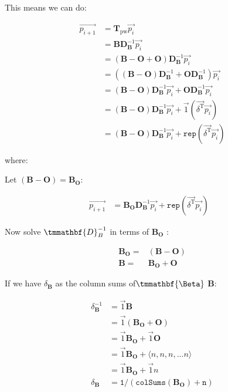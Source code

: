 \documentclass[11pt]{article}
\begin{document}
This means we can do:

\begin{align}
  \overrightarrow{p_{i + 1}} & = \mathbf{T}_{\mathrm{pw}}
  \overrightarrow{p_i}\\
& = \mathbf{BD}_{\mathbf{B}}^{- 1}
  \overrightarrow{p_i}\\
  & = \left( \mathbf{B} - \mathbf{O} + \mathbf{O} \right)
  \mathbf{D}_{\mathbf{B}}^{- 1} \overrightarrow{p_i}\\
  & = \left( \left( \mathbf{B} - \mathbf{O} \right)
  \mathbf{D}_{\mathbf{B}}^{- 1} + \mathbf{OD}_{\mathbf{B}}^{- 1} \right)
  \overrightarrow{p_i}\\
  & = \left( \mathbf{B} - \mathbf{O} \right) \mathbf{D}_{\mathbf{B}}^{- 1}
  \overrightarrow{p_i} + \mathbf{OD}_{\mathbf{B}}^{- 1} \overrightarrow{p_i}\\
  & = \left( \mathbf{B} - \mathbf{O} \right) \mathbf{D}_{\mathbf{B}}^{- 1}
  \overrightarrow{p_i} + \vec{1} (\overrightarrow{\delta^{\mathrm{T}}}
  \overrightarrow{p_i}) \\
  & = \left( \mathbf{B} - \mathbf{O} \right) \mathbf{D}_{\mathbf{B}}^{- 1}
  \overrightarrow{p_i} + \mathtt{rep} (\overrightarrow{\delta^{\mathrm{T}}}
  \overrightarrow{p_i})
\end{align}

where:


Let \((\mathbf{B}-\mathbf{O}) = \mathbf{B_{\mathbf{O}}}\):

\begin{eqnarray*}
  \overrightarrow{p_{i + 1}} & = \mathbf{B_{\mathbf{O}}} \mathbf{D}_{\mathbf{B}}^{- 1}
  \overrightarrow{p_i} + \mathtt{rep} (\overrightarrow{\delta^{\mathrm{T}}}
  \overrightarrow{p_i}) &
\end{eqnarray*}

Now solve \(\tmmathbf{D}_B^{- 1}\) in terms of \(\mathbf{B_{O}}\) :

\begin{align}
  \mathbf{B}_{\mathbf{\mathbf{O}}} = & (\mathbf{B}-\mathbf{O})\\
  \mathbf{B} = & \mathbf{B}_{\mathbf{\mathbf{O}}}
  +\mathbf{O}
\end{align}

If we have \(\delta_{\mathbf{B}}\) as the column sums of\(\tmmathbf{\Beta}\) \(\mathbf{B}\):

\begin{align}
\delta^{-1}_{\mathbf{B}} &= \vec{1}\mathbf{B} \\
&= \vec{1} \left( \mathbf{B_{O}} + \mathbf{O}\right) \\
&= \vec{1}  \mathbf{B_{O}} + \vec{1}\mathbf{O} \\
&= \vec{1} \mathbf{B_{\mathbf{O}}} + \langle n, n, n, ... n \rangle \\
&= \vec{1} \mathbf{B_{\mathbf{O}}} + \vec{1} n \\
\delta_{\mathbf{B}}&=\mathtt{1/(colSums(\mathbf{B_{O}}) + n )}
\end{align}
\end{document}
